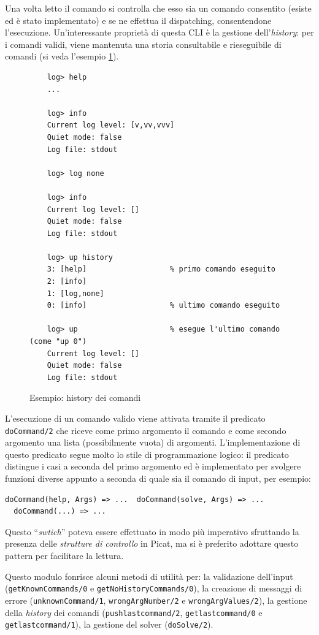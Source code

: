 \documentclass[12pt,a4paper,openright]{book} %
\begin{document}
Una volta letto il comando si controlla che esso sia un comando
consentito (esiste ed è stato implementato) e se ne effettua il
dispatching, consentendone l'esecuzione. Un'interessante proprietà di
questa CLI è la gestione dell'\textit{history}: per i comandi validi,
viene mantenuta una storia consultabile e rieseguibile di comandi (si
veda l'esempio \ref{fig:example_commandshistory}).

\begin{figure}
	\begin{verbatim}
	log> help
	...

	log> info
	Current log level: [v,vv,vvv]
	Quiet mode: false
	Log file: stdout

	log> log none

	log> info
	Current log level: []
	Quiet mode: false
	Log file: stdout

	log> up history
	3: [help]                   % primo comando eseguito
	2: [info]
	1: [log,none]
	0: [info]                   % ultimo comando eseguito

	log> up                     % esegue l'ultimo comando (come "up 0")
	Current log level: []
	Quiet mode: false
	Log file: stdout
	\end{verbatim}
	\caption{Esempio: history dei comandi}
	\label{fig:example_commandshistory}
\end{figure}

L'esecuzione di un comando valido viene attivata tramite il predicato
\texttt{doCommand/2} che riceve come primo argomento il comando e come
secondo argomento una lista (possibilmente vuota) di
argomenti. L'implementazione di questo predicato segue molto lo stile
di programmazione logico: il predicato distingue i casi a seconda del
primo argomento ed è implementato per svolgere funzioni diverse
appunto a seconda di quale sia il comando di input, per esempio:
\begin{verbatim}
doCommand(help, Args) => ...  doCommand(solve, Args) => ...
  doCommand(...) => ...
\end{verbatim}
Questo ``\textit{swtich}'' poteva essere effettuato in modo più
imperativo sfruttando la presenza delle \textit{strutture di
  controllo} in Picat, ma si è preferito adottare questo pattern per
facilitare la lettura.

Questo modulo fonrisce alcuni metodi di utilità per: la validazione
dell'input (\texttt{getKnownCommands/0} e
\texttt{getNoHistoryCommands/0}), la creazione di messaggi di errore
(\texttt{unknownCommand/1}, \texttt{wrongArgNumber/2} e
\texttt{wrongArgValues/2}), la gestione della \textit{history} dei
comandi (\texttt{push\textunderscore last\textunderscore command/2},
\texttt{get\textunderscore last\textunderscore command/0} e
\texttt{get\textunderscore last\textunderscore command/1}), la
gestione del solver (\texttt{doSolve/2}).
\end{document}
